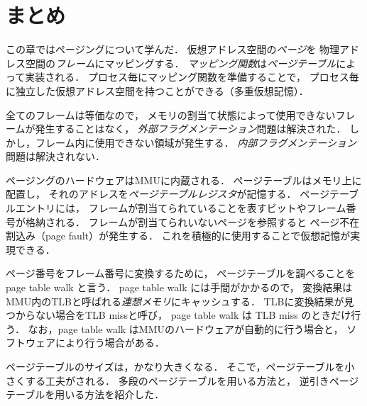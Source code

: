 \section{まとめ}
この章ではページングについて学んだ．
仮想アドレス空間の\emph{ページ}を
物理アドレス空間の\emph{フレーム}にマッピングする．
\emph{マッピング関数}は\emph{ページテーブル}によって実装される．
プロセス毎にマッピング関数を準備することで，
プロセス毎に独立した仮想アドレス空間を持つことができる（多重仮想記憶）．

全てのフレームは等価なので，
メモリの割当て状態によって使用できないフレームが発生することはなく，
\emph{外部フラグメンテーション}問題は解決された．
しかし，フレーム内に使用できない領域が発生する．
\emph{内部フラグメンテーション}問題は解決されない．

ページングのハードウェアはMMUに内蔵される．
ページテーブルはメモリ上に配置し，
それのアドレスを\emph{ページテーブルレジスタ}が記憶する．
ページテーブルエントリには，
フレームが割当てられていることを表すビットやフレーム番号が格納される．
フレームが割当てられいないページを参照すると
ページ不在割込み（page fault）が発生する．
これを積極的に使用することで仮想記憶が実現できる．

ページ番号をフレーム番号に変換するために，
ページテーブルを調べることを page table walk と言う．
page table walk には手間がかかるので，
変換結果はMMU内のTLBと呼ばれる\emph{連想メモリ}にキャッシュする．
TLBに変換結果が見つからない場合をTLB missと呼び，
page table walk は TLB miss のときだけ行う．
なお，page table walk はMMUのハードウェアが自動的に行う場合と，
ソフトウェアにより行う場合がある．

ページテーブルのサイズは，かなり大きくなる．
そこで，ページテーブルを小さくする工夫がされる．
多段のページテーブルを用いる方法と，
逆引きページテーブルを用いる方法を紹介した．

\newpage

